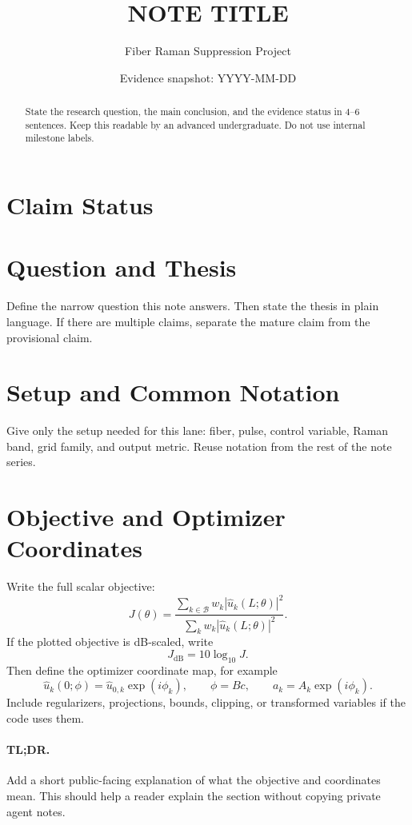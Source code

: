 \documentclass[11pt]{article}
\title{NOTE TITLE}
\author{Fiber Raman Suppression Project}
\date{Evidence snapshot: YYYY-MM-DD}
\begin{document}
\maketitle

\begin{abstract}
State the research question, the main conclusion, and the evidence status in
4--6 sentences.  Keep this readable by an advanced undergraduate.  Do not use
internal milestone labels.
\end{abstract}

\section*{Claim Status}

\section{Question and Thesis}

Define the narrow question this note answers.  Then state the thesis in plain
language.  If there are multiple claims, separate the mature claim from the
provisional claim.

\section{Setup and Common Notation}

Give only the setup needed for this lane: fiber, pulse, control variable,
Raman band, grid family, and output metric.  Reuse notation from the rest of
the note series.

\section{Objective and Optimizer Coordinates}

Write the full scalar objective:
\[
J(\theta)=
\frac{\sum_{k\in\mathcal B} w_k |\hat u_k(L;\theta)|^2}
{\sum_k w_k |\hat u_k(L;\theta)|^2}.
\]
If the plotted objective is dB-scaled, write
\[
J_{\mathrm{dB}}=10\log_{10}J.
\]
Then define the optimizer coordinate map, for example
\[
\hat u_k(0;\phi)=\hat u_{0,k}\exp(i\phi_k),
\qquad
\phi = Bc,
\qquad
a_k=A_k\exp(i\phi_k).
\]
Include regularizers, projections, bounds, clipping, or transformed variables
if the code uses them.

\paragraph{TL;DR.}
Add a short public-facing explanation of what the objective and coordinates
mean.  This should help a reader explain the section without copying private
agent notes.
\end{document}
